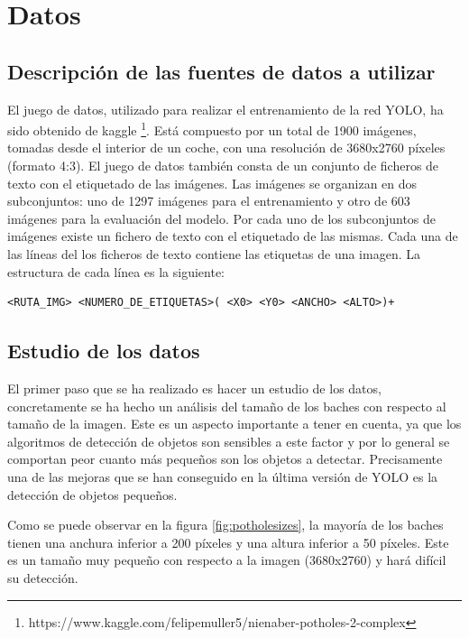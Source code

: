 \section{Datos}
\label{sec:datos}

\subsection{Descripción de las fuentes de datos a utilizar}

El juego de datos, utilizado para realizar el entrenamiento de la red YOLO, ha sido obtenido de kaggle \footnote{https://www.kaggle.com/felipemuller5/nienaber-potholes-2-complex}. Está compuesto por un total de 1900 imágenes, tomadas desde el interior de un coche, con una resolución de 3680x2760 píxeles (formato 4:3). El juego de datos también consta de un conjunto de ficheros de texto con el etiquetado de las imágenes. Las imágenes se organizan en dos subconjuntos: uno de 1297 imágenes para el entrenamiento y otro de 603 imágenes para la evaluación del modelo. Por cada uno de los subconjuntos de imágenes existe un fichero de texto con el etiquetado de las mismas. Cada una de las líneas del los ficheros de texto contiene las etiquetas de una imagen. La estructura de cada línea es la siguiente:

\begin{lstlisting}[frame=single,basicstyle=\ttfamily\footnotesize]
<RUTA_IMG> <NUMERO_DE_ETIQUETAS>( <X0> <Y0> <ANCHO> <ALTO>)+
\end{lstlisting}

\subsection{Estudio de los datos}

El primer paso que se ha realizado es hacer un estudio de los datos, concretamente se ha hecho un análisis del tamaño de los baches con respecto al tamaño de la imagen. Este es un aspecto importante a tener en cuenta, ya que los algoritmos de detección de objetos son sensibles a este factor y por lo general se comportan peor cuanto más pequeños son los objetos a detectar. Precisamente una de las mejoras que se han conseguido en la última versión de YOLO es la detección de objetos pequeños.

Como se puede observar en la figura \ref{fig:potholesizes}, la mayoría de los baches tienen una anchura inferior a 200 píxeles y una altura inferior a 50 píxeles. Este es un tamaño muy pequeño con respecto a la imagen (3680x2760) y hará difícil su detección.


